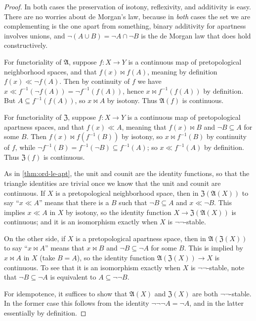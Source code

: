 \documentclass{article}
\def\cpl#1{\neg #1}
\def\inv{^{-1}}
\def\anti{\mathfrak{A}}
\def\neigh{\mathfrak{Z}}
\def\nn{\ensuremath{\neg\neg}}
\begin{document}
\begin{proof}
  In both cases the preservation of isotony, reflexivity, and additivity is easy.
  There are no worries about de Morgan's law, because in \emph{both} cases the set we are complementing is the one apart from something, binary additivity for apartness involves unions, and $\cpl{(A\cup B)} = \cpl{A} \cap \cpl{B}$ is the de Morgan law that does hold constructively.

  For functoriality of $\anti$, suppose $f:X\to Y$ is a continuous map of pretopological neighborhood spaces, and that $f(x) \bowtie f(A)$, meaning by definition $f(x)\ll \cpl{f(A)}$.
  Then by continuity of $f$ we have $x \ll f\inv(\cpl{f(A)}) = \cpl{f\inv(f(A))}$, hence $x\bowtie f\inv(f(A))$ by definition.
  But $A \subseteq f\inv(f(A))$, so $x\bowtie A$ by isotony.
  Thus $\anti(f)$ is continuous.

  For functoriality of $\neigh$, suppose $f:X\to Y$ is a continuous map of pretopological apartness spaces, and that $f(x) \ll A$, meaning that $f(x) \bowtie B$ and $\cpl{B} \subseteq A$ for some $B$.
  Then $f(x) \bowtie f(f\inv(B))$ by isotony, so $x\bowtie f\inv(B)$ by continuity of $f$, while $\cpl{f\inv(B)} = f\inv(\cpl{B}) \subseteq f\inv(A)$; so $x\ll f\inv(A)$ by definition.
  Thus $\neigh(f)$ is continuous.

  As in \cref{thm:ord-le-apt}, the unit and counit are the identity functions, so that the triangle identities are trivial once we know that the unit and counit are continuous.
  If $X$ is a pretopological neighborhood space, then in $\neigh(\anti(X))$ to say ``$x\ll A$'' means that there is a $B$ such that $\cpl{B}\subseteq A$ and $x\ll \cpl{B}$.
  This implies $x\ll A$ in $X$ by isotony, so the identity function $X\to \neigh(\anti(X))$ is continuous; and it is an isomorphism exactly when $X$ is \nn-stable.
  
  On the other side, if $X$ is a pretopological apartness space, then in $\anti(\neigh(X))$ to say ``$x\bowtie A$'' means that $x\bowtie B$ and $\cpl{B}\subseteq \cpl{A}$ for some $B$.
  This is implied by $x\bowtie A$ in $X$ (take $B=A$), so the identity function $\anti(\neigh(X)) \to X$ is continuous.
  To see that it is an isomorphism exactly when $X$ is \nn-stable, note that $\cpl{B}\subseteq \cpl{A}$ is equivalent to $A \subseteq \cpl{\cpl{B}}$.

  For idempotence, it suffices to show that $\anti(X)$ and $\neigh(X)$ are both \nn-stable.
  In the former case this follows from the identity $\cpl{\cpl{\cpl{A}}} = \cpl{A}$, and in the latter essentially by definition.


\end{proof}
\end{document}

